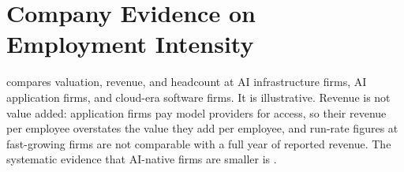 \section{Company Evidence on Employment Intensity}\label{app:company}


 compares valuation, revenue, and headcount at AI infrastructure firms, AI application firms, and cloud-era software firms.
It is illustrative.
Revenue is not value added: application firms pay model providers for access, so their revenue per employee overstates the value they add per employee, and run-rate figures at fast-growing firms are not comparable with a full year of reported revenue.
The systematic evidence that AI-native firms are smaller is \citet{kim2026ainative}.


